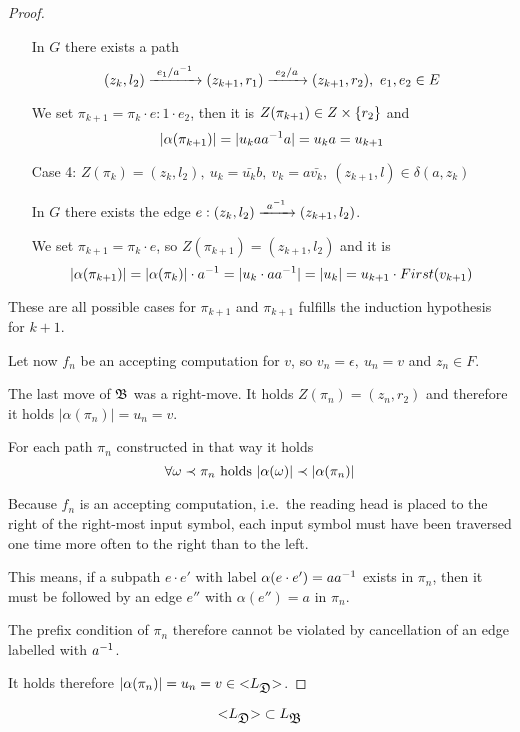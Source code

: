 \begin{proof}
\begin{itemize}
  In $G$ there exists a path 
  \[ (z_k, l_2) \xrightarrow{\ {e_1 / {{a}^{-1}}}\ } (z_{k+1}, r_1) \xrightarrow{\ {e_2 / a}\ } (z_{k+1},
  r_2),\ e_1, e_2 \in E \]
  
  We set $\pi_{k+1} = \pi_k \cdot e:1 \cdot e_2$, then it is $Z(\pi_{k+1}) \in
  Z \times \mbox{$\{r_2\}$}$ and
  \[ |\alpha(\pi_{k+1})| = |u_k a {{a}^{-1}} a| = u_k a = u_{k+1} \]
  
  \item[Case 4:] $Z(\pi_k) = (z_k, l_2),\ u_k = \bar{u_k} b,\ v_k = a
  \bar{v_k},\ (z_{k+1}, l) \in \delta(a, z_k)$
  
  In $G$ there exists the edge $e: (z_k, l_2) \xrightarrow{\ {{{a}^{-1}}}\ } (z_{k+1}, l_2)$.
  
  We set $\pi_{k+1} = \pi_k \cdot e$, so $Z(\pi_{k+1}) = (z_{k+1}, l_2)$ and it
  is
  \[ |\alpha(\pi_{k+1})| = |\alpha(\pi_k)| \cdot {{a}^{-1}} = |u_k \cdot a {{a}^{-1}}|
  = |u_k| = u_{k+1} \cdot First(v_{k+1}) \]
\end{itemize}

These are all possible cases for $\pi_{k+1}$ and $\pi_{k+1}$ fulfills the
induction hypothesis for $k+1$.

Let now $f_n$ be an accepting computation for $v$, so $v_n = \epsilon,\ u_n = v$
and $z_n \in F$.

The last move of $\mbox{$\mathfrak{B}$}$ was a right-move. It holds $Z(\pi_n) = (z_n, r_2)$ and
therefore it holds $|\alpha(\pi_n)| = u_n = v$.

For each path $\pi_n$ constructed in that way it holds
\[ \forall \omega \prec \pi_n \text{ holds }|\alpha(\omega)| \prec
|\alpha(\pi_n)| \]

Because $f_n$ is an accepting computation, i.e.\ the reading head is placed to
the right of the right-most input symbol, each input symbol must have been
traversed one time more often to the right than to the left.

This means, if a subpath $e \cdot e'$ with label $\alpha(e \cdot e') = a
{{a}^{-1}}$ exists in $\pi_n$, then it must be followed by an edge $e''$ with
$\alpha(e'') = a$ in $\pi_n$.

The prefix condition of $\pi_n$ therefore cannot be violated by cancellation of
an edge labelled with ${{a}^{-1}}$.

It holds therefore $|\alpha(\pi_n)| = u_n = v \in \mbox{${<}{L_{\mbox{$\mathfrak{D}$}}}{>}$}$.
\end{proof}

\bigskip
\begin{lemma}
\[ \mbox{${<}{L_{\mbox{$\mathfrak{D}$}}}{>}$} \subset L_{\mbox{$\mathfrak{B}$}} \]
\end{lemma}

